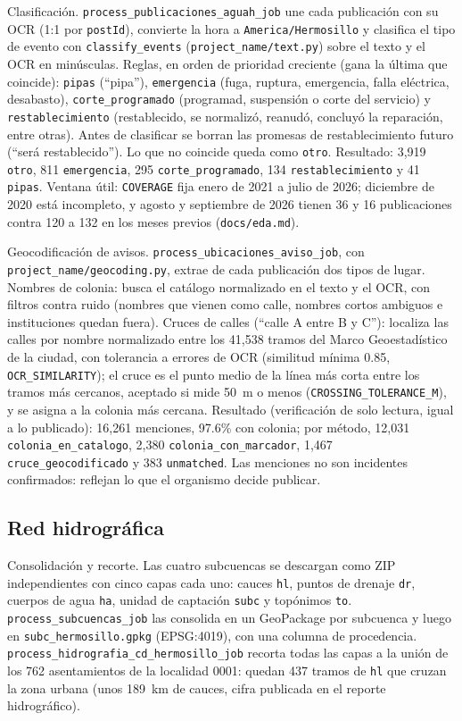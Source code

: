 \documentclass[11pt]{article}
\newcommand{\cod}[1]{\nolinkurl{#1}}
\begin{document}
Clasificación. \cod{process_publicaciones_aguah_job} une cada publicación con su OCR (1:1 por \cod{postId}), convierte la hora a \cod{America/Hermosillo} y clasifica el tipo de evento con \cod{classify_events} (\cod{project_name/text.py}) sobre el texto y el OCR en minúsculas. Reglas, en orden de prioridad creciente (gana la última que coincide): \cod{pipas} (``pipa''), \cod{emergencia} (fuga, ruptura, emergencia, falla eléctrica, desabasto), \cod{corte_programado} (programad, suspensión o corte del servicio) y \cod{restablecimiento} (restablecido, se normalizó, reanudó, concluyó la reparación, entre otras). Antes de clasificar se borran las promesas de restablecimiento futuro (``será restablecido''). Lo que no coincide queda como \cod{otro}. Resultado: 3,919 \cod{otro}, 811 \cod{emergencia}, 295 \cod{corte_programado}, 134 \cod{restablecimiento} y 41 \cod{pipas}. Ventana útil: \cod{COVERAGE} fija enero de 2021 a julio de 2026; diciembre de 2020 está incompleto, y agosto y septiembre de 2026 tienen 36 y 16 publicaciones contra 120 a 132 en los meses previos (\cod{docs/eda.md}).

Geocodificación de avisos. \cod{process_ubicaciones_aviso_job}, con \cod{project_name/geocoding.py}, extrae de cada publicación dos tipos de lugar. Nombres de colonia: busca el catálogo normalizado en el texto y el OCR, con filtros contra ruido (nombres que vienen como calle, nombres cortos ambiguos e instituciones quedan fuera). Cruces de calles (``calle A entre B y C''): localiza las calles por nombre normalizado entre los 41,538 tramos del Marco Geoestadístico de la ciudad, con tolerancia a errores de OCR (similitud mínima 0.85, \cod{OCR_SIMILARITY}); el cruce es el punto medio de la línea más corta entre los tramos más cercanos, aceptado si mide 50~m o menos (\cod{CROSSING_TOLERANCE_M}), y se asigna a la colonia más cercana. Resultado (verificación de solo lectura, igual a lo publicado): 16,261 menciones, 97.6\% con colonia; por método, 12,031 \cod{colonia_en_catalogo}, 2,380 \cod{colonia_con_marcador}, 1,467 \cod{cruce_geocodificado} y 383 \cod{unmatched}. Las menciones no son incidentes confirmados: reflejan lo que el organismo decide publicar.

\subsection{Red hidrográfica}

Consolidación y recorte. Las cuatro subcuencas se descargan como ZIP independientes con cinco capas cada uno: cauces \cod{hl}, puntos de drenaje \cod{dr}, cuerpos de agua \cod{ha}, unidad de captación \cod{subc} y topónimos \cod{to}. \cod{process_subcuencas_job} las consolida en un GeoPackage por subcuenca y luego en \cod{subc_hermosillo.gpkg} (EPSG:4019), con una columna de procedencia. \cod{process_hidrografia_cd_hermosillo_job} recorta todas las capas a la unión de los 762 asentamientos de la localidad 0001: quedan 437 tramos de \cod{hl} que cruzan la zona urbana (unos 189~km de cauces, cifra publicada en el reporte hidrográfico).
\end{document}

